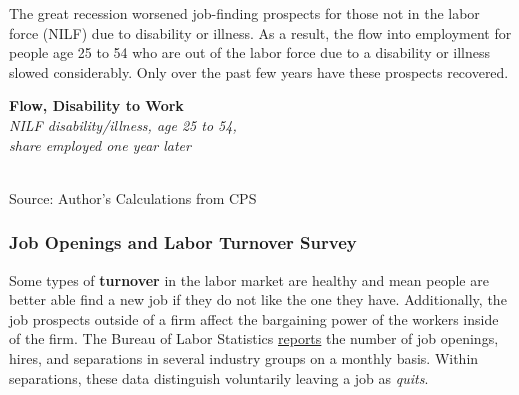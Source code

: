 \documentclass{report}
\makeatletter
\newcommand{\tbllink}[1]{\href{https://raw.githubusercontent.com/bdecon/US-chartbook/master/chartbook/data/#1}{\faTable}}
\newcommand*\short[1]{\expandafter\@gobbletwo\number\numexpr#1\relax}
\newcommand{\shdateaxisticks}{
		date coordinates in=x, axis line style={draw=none},
		xmax={2021-02-01},
		max space between ticks=40,	    
		xtick={{1990-01-01}, {1995-01-01}, {2000-01-01}, 
			{2005-01-01}, {2010-01-01}, {2015-01-01}, {2020-01-01}},
		minor xtick={},
		enlarge y limits={0.06}, enlarge x limits={0.01},
		}
\newcommand{\bbar}[2]{extra #1 ticks = {{#2}}, extra #1 tick labels = ,
		extra #1 tick style = {grid=major, grid style={thick, black!25}},}
\newcommand{\stdline}[4]{\addplot[very thick, no markers, color=#1] 
		table [x=#2, y=#3, col sep=comma] {#4};	}
\newcommand{\rebars}{
		\fill[color=black!10] (axis cs:{2007-12-01},\pgfkeysvalueof{/pgfplots/ymin}) rectangle 
			(axis cs:{2009-07-01}, \pgfkeysvalueof{/pgfplots/ymax});
		\fill[color=black!10] (axis cs:{2001-03-01},\pgfkeysvalueof{/pgfplots/ymin}) rectangle 
			(axis cs:{2001-11-01}, \pgfkeysvalueof{/pgfplots/ymax});}
\makeatother
\begin{document}
{{{{{{{{{\begin{minipage}{0.76\textwidth}
\end{minipage}

\vspace{5mm}

\begin{minipage}{0.33\textwidth}
\small The great recession worsened job-finding prospects for those not in the labor force (NILF) due to disability or illness. As a result, the flow into employment for people age 25 to 54 who are out of the labor force due to a disability or illness slowed considerably. Only over the past few years have these prospects recovered. 
\end{minipage} \hspace{5mm} \begin{minipage}{0.39\textwidth}
\noindent \normalsize \textbf{Flow, Disability to Work}\\
\footnotesize{\textit{NILF disability/illness, age 25 to 54,}}\\
\footnotesize{\textit{share employed one year later}}\\
\noindent \hspace*{-2mm} \\
\footnotesize{Source: Author's Calculations from CPS} \hfill \tbllink{disflow.csv}
\end{minipage}

\newpage

\subsubsection*{\color{black!70} \seriffont Job Openings and Labor Turnover Survey}
\begin{minipage}{0.76\textwidth}
\small Some types of \textbf{turnover} in the labor market are healthy and mean people are better able find a new job if they do not like the one they have. Additionally, the job prospects outside of a firm affect the bargaining power of the workers inside of the firm. The Bureau of Labor Statistics \href{https://www.bls.gov/news.release/pdf/jolts.pdf}{reports} the number of job openings, hires, and separations in several industry groups on a monthly basis. Within separations, these data distinguish voluntarily leaving a job as \textit{quits}. 
\end{minipage}\\

}}}}}}}}}
\end{document}
